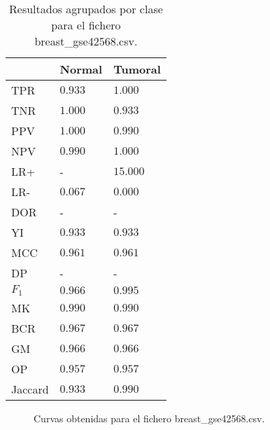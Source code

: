 \begin{table}[htp]
    \small
    \centering
    \begin{tabularx}{\columnwidth}{l Y Y}
                &  Normal               & Tumoral       \\\hline
        TPR     &  $0.933$              & $1.000$       \\\hline
        TNR     &  $1.000$              & $0.933$       \\\hline
        PPV     &  $1.000$              & $0.990$       \\\hline
        NPV     &  $0.990$              & $1.000$       \\\hline
        LR+     &  -                    & $15.000$      \\\hline
        LR-     &  $0.067$              & $0.000$       \\\hline
        DOR     &  -                    & -             \\\hline
        YI      &  $0.933$              & $0.933$       \\\hline
        MCC     &  $0.961$              & $0.961$       \\\hline
        DP      &  -                    & -             \\\hline
        $F_{1}$ &  $0.966$              & $0.995$       \\\hline
        MK      &  $0.990$              & $0.990$       \\\hline
        BCR     &  $0.967$              & $0.967$       \\\hline
        GM      &  $0.966$              & $0.966$       \\\hline
        OP      &  $0.957$              & $0.957$       \\\hline
        Jaccard &  $0.933$              & $0.990$       \\\hline
    \end{tabularx}
    \caption{Resultados agrupados por clase para el fichero breast\_gse42568.csv.}
    \label{tab:17}
\end{table}

\clearpage

\begin{figure}[htp]
    \centering
    \caption{Curvas obtenidas para el fichero breast\_gse42568.csv.}
    \label{fig:13}
\end{figure}

